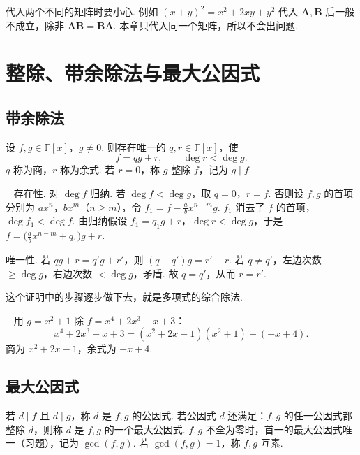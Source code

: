 \documentclass[lang=cn,10.5pt,scheme=chinese,toc=twocol,section,chinesefont=nofont,
twoside,citestyle=gb7714-2015,bibstyle=gb7714-2015]{elegantbook}
\DeclareRobustCommand{\textbf}[1]{{\lnsemiboldlatin\lnsemiboldcjk #1}}
\newcommand{\vv}[1]{\boldsymbol{#1}}
\numberwithin{equation}{section}   %
\newcommand{\hB}{\texorpdfstring{\textdagger}{†}}
\newcommand*{\lnlabel}[1]{{\sffamily\bfseries\color{black}#1}}
\renewenvironment{example}[1][]{%
	\refstepcounter{exam}%
	\par\noindent\lnlabel{\examplename\ \theexam\ifblank{#1}{}{\ #1}}\ \rmfamily}{%
	\par\ignorespacesafterend}
\renewenvironment{proof}{%
	\par\noindent\lnlabel{\proofname}\;\ \color{black!90}\cfs}{\par}
\begin{document}
\begin{pitfallbox}
  代入两个\textbf{不同}的矩阵时要小心. 例如 $(x+y)^2=x^2+2xy+y^2$ 代入 $\vv A,\vv B$ 后一般不成立，除非 $\vv{AB}=\vv{BA}$. 本章只代入同一个矩阵，所以不会出问题.
\end{pitfallbox}

\section{\hB 整除、带余除法与最大公因式}

\subsection{带余除法}

\begin{theorem}[带余除法]\label{thm:divalg}
  设 $f,g\in\mathbb{F}[x]$，$g\ne0$. 则存在唯一的 $q,r\in\mathbb{F}[x]$，使
  \[f=qg+r,\qquad \deg r<\deg g.\]
  $q$ 称为\textbf{商}，$r$ 称为\textbf{余式}. 若 $r=0$，称 $g$ \textbf{整除} $f$，记为 $g\mid f$.
\end{theorem}
\begin{proof}
  \textbf{存在性.} 对 $\deg f$ 归纳. 若 $\deg f<\deg g$，取 $q=0$，$r=f$. 否则设 $f,g$ 的首项分别为 $ax^n$，$bx^m$（$n\ge m$），令 $f_1=f-\frac ab x^{n-m}g$. $f_1$ 消去了 $f$ 的首项，$\deg f_1<\deg f$. 由归纳假设 $f_1=q_1g+r$，$\deg r<\deg g$，于是 $f=\big(\frac abx^{n-m}+q_1\big)g+r$.

  \textbf{唯一性.} 若 $qg+r=q'g+r'$，则 $(q-q')g=r'-r$. 若 $q\ne q'$，左边次数 $\ge\deg g$，右边次数 $<\deg g$，矛盾. 故 $q=q'$，从而 $r=r'$.
\end{proof}

这个证明中的步骤逐步做下去，就是多项式的综合除法.

\begin{example}
  用 $g=x^2+1$ 除 $f=x^4+2x^3+x+3$：
  \[x^4+2x^3+x+3=(x^2+2x-1)(x^2+1)+(-x+4).\]
  商为 $x^2+2x-1$，余式为 $-x+4$.
\end{example}
\subsection{最大公因式}

\begin{definition}
  若 $d\mid f$ 且 $d\mid g$，称 $d$ 是 $f,g$ 的\textbf{公因式}. 若公因式 $d$ 还满足：$f,g$ 的任一公因式都整除 $d$，则称 $d$ 是 $f,g$ 的一个\textbf{最大公因式}. $f,g$ 不全为零时，首一的最大公因式唯一（习题），记为 $\gcd(f,g)$. 若 $\gcd(f,g)=1$，称 $f,g$ \textbf{互素}.
\end{definition}
\end{document}
